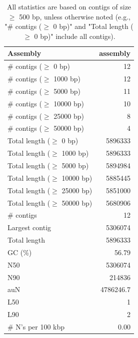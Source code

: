 \documentclass[12pt,a4paper]{article}
\begin{document}
\begin{table}[ht]
\begin{center}
\caption{All statistics are based on contigs of size $\geq$ 500 bp, unless otherwise noted (e.g., "\# contigs ($\geq$ 0 bp)" and "Total length ($\geq$ 0 bp)" include all contigs).}
\begin{tabular}{|l*{1}{|r}|}
\hline
Assembly & assembly \\ \hline
\# contigs ($\geq$ 0 bp) & 12 \\ \hline
\# contigs ($\geq$ 1000 bp) & 12 \\ \hline
\# contigs ($\geq$ 5000 bp) & 11 \\ \hline
\# contigs ($\geq$ 10000 bp) & 10 \\ \hline
\# contigs ($\geq$ 25000 bp) & 8 \\ \hline
\# contigs ($\geq$ 50000 bp) & 4 \\ \hline
Total length ($\geq$ 0 bp) & 5896333 \\ \hline
Total length ($\geq$ 1000 bp) & 5896333 \\ \hline
Total length ($\geq$ 5000 bp) & 5894984 \\ \hline
Total length ($\geq$ 10000 bp) & 5885445 \\ \hline
Total length ($\geq$ 25000 bp) & 5851000 \\ \hline
Total length ($\geq$ 50000 bp) & 5680906 \\ \hline
\# contigs & 12 \\ \hline
Largest contig & 5306074 \\ \hline
Total length & 5896333 \\ \hline
GC (\%) & 56.79 \\ \hline
N50 & 5306074 \\ \hline
N90 & 214836 \\ \hline
auN & 4786246.7 \\ \hline
L50 & 1 \\ \hline
L90 & 2 \\ \hline
\# N's per 100 kbp & 0.00 \\ \hline
\end{tabular}
\end{center}
\end{table}
\end{document}

